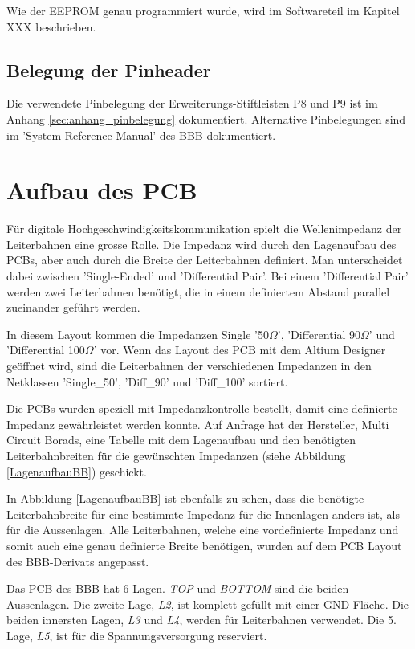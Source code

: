 Wie der EEPROM genau programmiert wurde, wird im Softwareteil im Kapitel XXX beschrieben.



\subsection{Belegung der Pinheader}
Die verwendete Pinbelegung der Erweiterungs-Stiftleisten P8 und P9 ist im Anhang \ref{sec:anhang_pinbelegung} dokumentiert. Alternative Pinbelegungen sind im 'System Reference Manual'\cite{adafruitSRM}  des BBB dokumentiert.




\section{Aufbau des PCB}\label{aufbauPCB}
Für digitale Hochgeschwindigkeitskommunikation spielt die Wellenimpedanz der Leiterbahnen eine grosse Rolle. Die Impedanz wird durch den Lagenaufbau des PCBs, aber auch durch die Breite der Leiterbahnen definiert. Man unterscheidet dabei zwischen 'Single-Ended' und 'Differential Pair'. Bei einem 'Differential Pair' werden zwei Leiterbahnen benötigt, die in einem definiertem Abstand parallel zueinander geführt werden.

In diesem Layout kommen die Impedanzen Single '50$\Omega$', 'Differential 90$\Omega$' und 'Differential 100$\Omega$' vor. Wenn das Layout des PCB mit dem Altium Designer geöffnet wird, sind die Leiterbahnen der verschiedenen Impedanzen in den Netklassen 'Single\_50', 'Diff\_90' und 'Diff\_100' sortiert.

Die PCBs wurden speziell mit Impedanzkontrolle bestellt, damit eine definierte Impedanz gewährleistet werden konnte. Auf Anfrage hat der Hersteller, Multi Circuit Borads, eine Tabelle mit dem Lagenaufbau und den benötigten Leiterbahnbreiten für die gewünschten Impedanzen (siehe Abbildung \ref{LagenaufbauBB}) geschickt.

In Abbildung \ref{LagenaufbauBB} ist ebenfalls zu sehen, dass die benötigte Leiterbahnbreite für eine bestimmte Impedanz für die Innenlagen anders ist, als für die Aussenlagen. Alle Leiterbahnen, welche eine vordefinierte Impedanz und somit auch eine genau definierte Breite benötigen, wurden auf dem PCB Layout des BBB-Derivats angepasst.

Das PCB des BBB hat 6 Lagen. \textit{TOP} und \textit{BOTTOM} sind die beiden Aussenlagen. Die zweite Lage, \textit{L2}, ist komplett gefüllt mit einer GND-Fläche. Die beiden innersten Lagen, \textit{L3} und \textit{L4}, werden für Leiterbahnen verwendet. Die 5. Lage, \textit{L5}, ist für die Spannungsversorgung reserviert.



